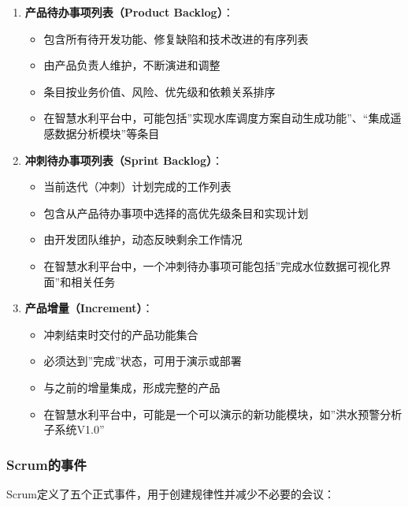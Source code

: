 \begin{enumerate}
\def\labelenumi{\arabic{enumi}.}
\tightlist
\item
  \textbf{产品待办事项列表（Product Backlog）}：

  \begin{itemize}
  \tightlist
  \item
    包含所有待开发功能、修复缺陷和技术改进的有序列表
  \item
    由产品负责人维护，不断演进和调整
  \item
    条目按业务价值、风险、优先级和依赖关系排序
  \item
    在智慧水利平台中，可能包括''实现水库调度方案自动生成功能''、``集成遥感数据分析模块''等条目
  \end{itemize}
\item
  \textbf{冲刺待办事项列表（Sprint Backlog）}：

  \begin{itemize}
  \tightlist
  \item
    当前迭代（冲刺）计划完成的工作列表
  \item
    包含从产品待办事项中选择的高优先级条目和实现计划
  \item
    由开发团队维护，动态反映剩余工作情况
  \item
    在智慧水利平台中，一个冲刺待办事项可能包括''完成水位数据可视化界面''和相关任务
  \end{itemize}
\item
  \textbf{产品增量（Increment）}：

  \begin{itemize}
  \tightlist
  \item
    冲刺结束时交付的产品功能集合
  \item
    必须达到''完成''状态，可用于演示或部署
  \item
    与之前的增量集成，形成完整的产品
  \item
    在智慧水利平台中，可能是一个可以演示的新功能模块，如''洪水预警分析子系统V1.0''
  \end{itemize}
\end{enumerate}

\subsubsection{Scrum的事件}\label{scrumux7684ux4e8bux4ef6}

Scrum定义了五个正式事件，用于创建规律性并减少不必要的会议：

